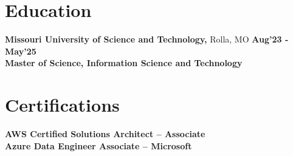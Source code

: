 \documentclass{article}
\begin{document}
\section{Education}

\textbf{Missouri University of Science and Technology,} Rolla, MO 
\hfill \textbf{Aug'23 - May'25} \\

\textbf{Master of Science, Information Science and Technology} \\

\section{Certifications}

\textbf{AWS Certified Solutions Architect -- Associate} \\

\textbf{Azure Data Engineer Associate -- Microsoft} \\
\end{document}
